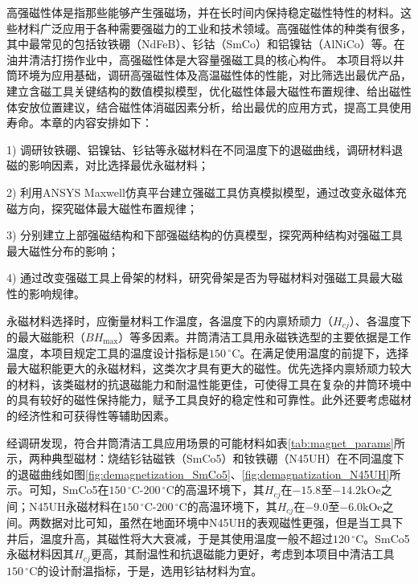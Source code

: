 高强磁性体是指那些能够产生强磁场，并在长时间内保持稳定磁性特性的材料。这些材料广泛应用于各种需要强磁力的工业和技术领域。高强磁性体的种类有很多，其中最常见的包括钕铁硼（NdFeB）、钐钴（SmCo）和铝镍钴（AlNiCo）等。在油井清洁打捞作业中，高强磁性体是大容量强磁工具的核心构件。
本项目将以井筒环境为应用基础，调研高强磁性体及高温磁性体的性能，对比筛选出最优产品，建立含磁工具关键结构的数值模拟模型，优化磁性体最大磁性布置规律、给出磁性体安放位置建议，结合磁性体消磁因素分析，给出最优的应用方式，提高工具使用寿命。本章的内容安排如下：

1) 调研钕铁硼、铝镍钴、钐钴等永磁材料在不同温度下的退磁曲线，调研材料退磁的影响因素，对比选择最优永磁材料；

2) 利用ANSYS Maxwell仿真平台建立强磁工具仿真模拟模型，通过改变永磁体充磁方向，探究磁体最大磁性布置规律；

3) 分别建立上部强磁结构和下部强磁结构的仿真模型，探究两种结构对强磁工具最大磁性分布的影响；

4) 通过改变强磁工具上骨架的材料，研究骨架是否为导磁材料对强磁工具最大磁性的影响规律。


永磁材料选择时，应衡量材料工作温度，各温度下的内禀矫顽力（$H_{cj}$）、各温度下的最大磁能积（$BH_{\max}$）等多因素。井筒清洁工具用永磁铁选型的主要依据是工作温度，本项目规定工具的温度设计指标是$150\,^\circ\mathrm{C}$。在满足使用温度的前提下，选择最大磁积能更大的永磁材料，这类次才具有更大的磁性。优先选择内禀矫顽力较大的材料，该类磁材的抗退磁能力和耐温性能更佳，可使得工具在复杂的井筒环境中的具有较好的磁性保持能力，赋予工具良好的稳定性和可靠性。此外还要考虑磁材的经济性和可获得性等辅助因素。

经调研发现，符合井筒清洁工具应用场景的可能材料如表\ref{tab:magnet_params}所示，两种典型磁材：烧结钐钴磁铁（SmCo5）和钕铁硼（N45UH）在不同温度下的退磁曲线如图\ref{fig:demagnetization_SmCo5}、\ref{fig:demagnatization_N45UH}所示。可知，SmCo5在$150\,^\circ\mathrm{C}$-$200\,^\circ\mathrm{C}$的高温环境下，其$H_{cj}$在$-15.8$至$-14.2\mathrm{kOe}$之间；N45UH永磁材料在$150\,^\circ\mathrm{C}$-$200\,^\circ\mathrm{C}$的高温环境下，其$H_{cj}$在$-9.0$至$-6.0\mathrm{kOe}$之间。两数据对比可知，虽然在地面环境中N45UH的表观磁性更强，但是当工具下井后，温度升高，其磁性将大大衰减，于是其使用温度一般不超过$120\,^\circ\mathrm{C}$。SmCo5永磁材料因其$H_{cj}$更高，其耐温性和抗退磁能力更好，考虑到本项目中清洁工具$150\,^\circ\mathrm{C}$的设计耐温指标，于是，选用钐钴材料为宜。

